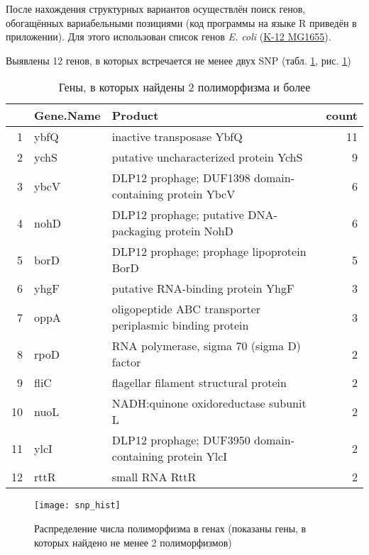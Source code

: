 \documentclass[a4paper,12pt]{article}
\newcommand{\myPictWidth}{.9\textwidth}
\begin{document}
После нахождения структурных вариантов осуществлён поиск генов, обогащённых вариабельными позициями (код программы на языке R приведён в приложении).
Для этого использован список генов \textit{E. coli} (\href{https://biocyc.org/group?id=biocyc13-24029-3731963750}{K-12 MG1655}).

Выявлены 12 генов, в которых встречается не менее двух SNP (табл. \ref{tab:snp}, рис. \ref{fig:hist})

\begin{table}[H]
    \centering
    \caption{Гены, в которых найдены 2 полиморфизма и более}
    \begin{tabular}{rllr}
        \hline
        & Gene.Name & Product & count \\
        \hline
        1 & ybfQ & inactive transposase YbfQ &  11 \\
        2 & ychS & putative uncharacterized protein YchS &   9 \\
        3 & ybcV & DLP12 prophage; DUF1398 domain-containing protein YbcV &   6 \\
        4 & nohD & DLP12 prophage; putative DNA-packaging protein NohD &   6 \\
        5 & borD & DLP12 prophage; prophage lipoprotein BorD &   5 \\
        6 & yhgF & putative RNA-binding protein YhgF &   3 \\
        7 & oppA & oligopeptide ABC transporter periplasmic binding protein &   3 \\
        8 & rpoD & RNA polymerase, sigma 70 (sigma D) factor &   2 \\
        9 & fliC & flagellar filament structural protein &   2 \\
        10 & nuoL & NADH:quinone oxidoreductase subunit L &   2 \\
        11 & ylcI & DLP12 prophage; DUF3950 domain-containing protein YlcI &   2 \\
        12 & rttR & small RNA RttR &   2 \\
        \hline
    \end{tabular}
    \label{tab:snp}
\end{table}

\begin{figure}[H]
    \centering
    \texttt{[image: snp\_hist]}
    \caption{Распределение числа полиморфизма в генах (показаны гены, в которых найдено не менее 2 полиморфизмов)}
    \label{fig:hist}
\end{figure}
\end{document}
